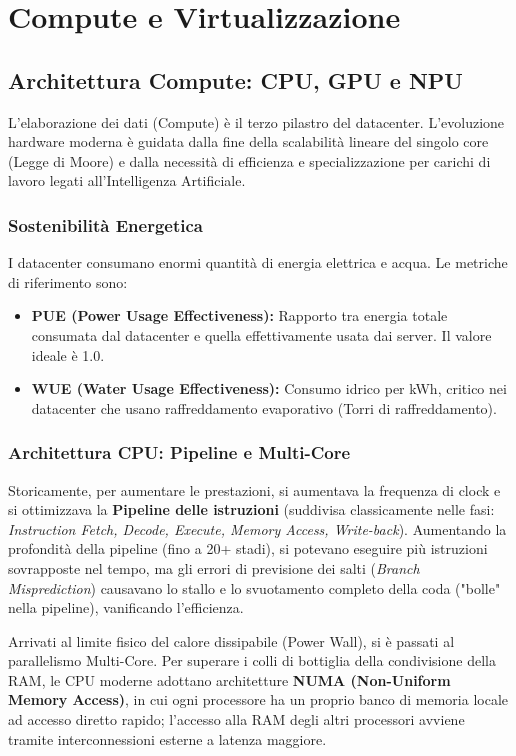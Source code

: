 \chapter{Compute e Virtualizzazione}

\section{Architettura Compute: CPU, GPU e NPU}
L'elaborazione dei dati (Compute) è il terzo pilastro del datacenter. L'evoluzione hardware moderna è guidata dalla fine della scalabilità lineare del singolo core (Legge di Moore) e dalla necessità di efficienza e specializzazione per carichi di lavoro legati all'Intelligenza Artificiale.

\subsection{Sostenibilità Energetica}
I datacenter consumano enormi quantità di energia elettrica e acqua. Le metriche di riferimento sono:
\begin{itemize}
    \item \textbf{PUE (Power Usage Effectiveness):} Rapporto tra energia totale consumata dal datacenter e quella effettivamente usata dai server. Il valore ideale è 1.0.
    \item \textbf{WUE (Water Usage Effectiveness):} Consumo idrico per kWh, critico nei datacenter che usano raffreddamento evaporativo (Torri di raffreddamento).
\end{itemize}

\subsection{Architettura CPU: Pipeline e Multi-Core}
Storicamente, per aumentare le prestazioni, si aumentava la frequenza di clock e si ottimizzava la \textbf{Pipeline delle istruzioni} (suddivisa classicamente nelle fasi: \textit{Instruction Fetch, Decode, Execute, Memory Access, Write-back}). Aumentando la profondità della pipeline (fino a 20+ stadi), si potevano eseguire più istruzioni sovrapposte nel tempo, ma gli errori di previsione dei salti (\textit{Branch Misprediction}) causavano lo stallo e lo svuotamento completo della coda ("bolle" nella pipeline), vanificando l'efficienza. 

Arrivati al limite fisico del calore dissipabile (Power Wall), si è passati al parallelismo Multi-Core. Per superare i colli di bottiglia della condivisione della RAM, le CPU moderne adottano architetture \textbf{NUMA (Non-Uniform Memory Access)}, in cui ogni processore ha un proprio banco di memoria locale ad accesso diretto rapido; l'accesso alla RAM degli altri processori avviene tramite interconnessioni esterne a latenza maggiore.

